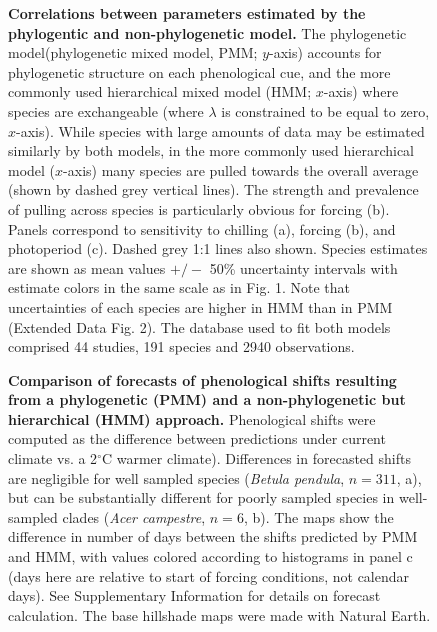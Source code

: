 \documentclass[11pt]{article}
\begin{document}
\begin{figure} [h!]
  \caption{\textbf{Correlations between parameters estimated by the phylogentic and non-phylogenetic model.} The phylogenetic model(phylogenetic mixed model, PMM; $y$-axis) accounts for phylogenetic structure on each phenological cue, and the more commonly used hierarchical mixed model (HMM; $x$-axis) where species are exchangeable (where $\lambda$ is constrained to be equal to zero, $x$-axis). While species with large amounts of data may be estimated similarly by both models, in the more commonly used hierarchical model ($x$-axis) many species are pulled towards the overall average (shown by dashed grey vertical lines). The strength and prevalence of pulling across species is particularly obvious for forcing (b). Panels correspond to sensitivity to chilling (a), forcing (b), and photoperiod (c). Dashed grey 1:1 lines also shown. Species estimates are shown as mean values $+/-$ 50\% uncertainty intervals with estimate colors in the same scale as in Fig. 1. Note that uncertainties of each species are higher in HMM than in PMM (Extended Data Fig. 2). The database used to fit both models comprised 44 studies, 191 species and 2940 observations.}
  \label{fig:correls_angio}
\end{figure}

\begin{figure} [h!]
  \caption{\textbf{Comparison of forecasts of phenological shifts resulting from a phylogenetic (PMM) and a non-phylogenetic but hierarchical (HMM) approach.} Phenological shifts were computed as the difference between predictions under current climate vs. a 2$^{\circ}$C warmer climate). Differences in forecasted shifts are negligible for well sampled species (\emph{Betula pendula}, $n = 311$, a), but can be substantially different for poorly sampled species in well-sampled clades (\emph{Acer campestre}, $n = 6$, b). The maps show the difference in number of days between the shifts predicted by PMM and HMM, with values colored according to histograms in panel c (days here are relative to start of forcing conditions, not calendar days). See Supplementary Information for details on forecast calculation. The base hillshade maps were made with Natural Earth.}
  \label{fig:forecast}
\end{figure}
\end{document}
